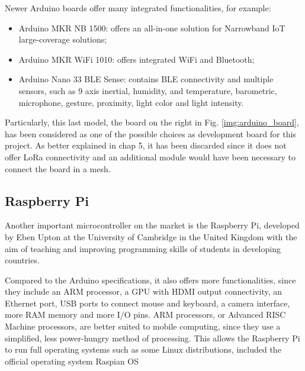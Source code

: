 		Newer Arduino boards offer many integrated functionalities, for example:
		\begin{itemize}[noitemsep]
			\item Arduino MKR NB 1500: offers an all-in-one solution for Narrowband IoT large-coverage solutions;
			\item Arduino MKR WiFi 1010: offers integrated WiFi and Bluetooth;
			\item Arduino Nano 33 BLE Sense: contains BLE connectivity and multiple sensors, such as 9 axis inertial, humidity, and temperature, barometric, microphone, gesture, proximity, light color and light intensity.
		\end{itemize}
	
		Particularly, this last model, the board on the right in Fig. \ref{img:arduino_board}, has been considered as one of the possible choices as development board for this project.
		As better explained in chap 5, it has been discarded since it does not offer LoRa connectivity and an additional module would have been necessary to connect the board in a mesh.
							
	\subsection{Raspberry Pi}

		Another important microcontroller on the market is the Raspberry Pi, developed by Eben Upton at the University of Cambridge in the United Kingdom with the aim of teaching and improving programming skills of students in developing countries.
		
		Compared to the Arduino specifications, it also offers more functionalities, since they include an ARM processor, a GPU with HDMI output connectivity, an Ethernet port, USB ports to connect mouse and keyboard, a camera interface, more RAM memory and more I/O pins.
		ARM processors, or Advanced RISC Machine processors, are better suited to mobile computing, since they use a simplified, less power-hungry method of processing.
		This allows the Raspberry Pi to run full operating systems such as some Linux distributions, included the official operating system Raspian OS
		
